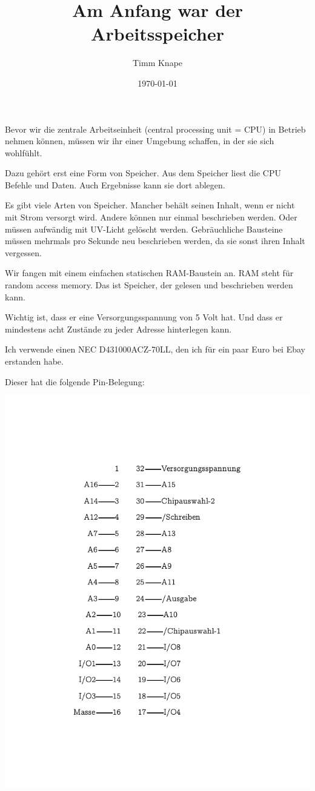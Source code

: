 \documentclass[a5paper,ngerman]{article}
\title{\color{emph}Am Anfang war der Arbeitsspeicher}
\author{Timm Knape}
\date{\today}
\begin{document}
\pagecolor{background}
\color{normal}
\allsectionsfont{\color{emph}\mdseries}
\pagestyle{plain}
\maketitle
\thispagestyle{fancy}
\begin{multicols}{2}

Bevor wir die zentrale Arbeitseinheit (central processing unit = CPU)
in Betrieb nehmen können,
müssen wir ihr einer Umgebung schaffen, in der sie sich wohlfühlt.

Dazu gehört erst eine Form von Speicher.
Aus dem Speicher liest die CPU Befehle und Daten.
Auch Ergebnisse kann sie dort ablegen.

Es gibt viele Arten von Speicher.
Mancher behält seinen Inhalt, wenn er nicht mit Strom versorgt wird.
Andere können nur einmal beschrieben werden.
Oder müssen aufwändig mit UV-Licht gelöscht werden.
Gebräuchliche Bausteine müssen mehrmals pro Sekunde neu beschrieben
werden, da sie sonst ihren Inhalt vergessen.

Wir fangen mit einem einfachen statischen RAM-Baustein an.
RAM steht für random access memory.
Das ist Speicher, der gelesen und beschrieben werden kann.

Wichtig ist, dass er eine Versorgungsspannung von 5 Volt hat.
Und dass er mindestens acht Zustände zu jeder Adresse hinterlegen kann.

Ich verwende einen NEC D431000ACZ-70LL, den ich für ein paar Euro bei
Ebay erstanden habe.

Dieser hat die folgende Pin-Belegung:

\centerline{\includegraphics[trim={1in .9in 1in .9in},clip]{imgs/dot-1.pdf}}
\end{multicols}
\end{document}
